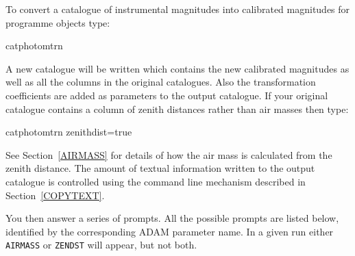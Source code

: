 \documentclass[twoside,11pt]{starlink}
\begin{document}
To convert a catalogue of instrumental magnitudes into calibrated
magnitudes for programme objects type:

\begin{terminalv}
catphotomtrn
\end{terminalv}

A new catalogue will be written which contains the new calibrated
magnitudes as well as all the columns in the original catalogues.  Also
the transformation coefficients are added as parameters to the output
catalogue.  If your original catalogue contains a column of zenith
distances rather than air masses then type:

\begin{terminalv}
catphotomtrn  zenithdist=true
\end{terminalv}

See Section~\ref{AIRMASS} for details of how the air mass is calculated
from the zenith distance.  The amount of textual information written to
the output catalogue is controlled using the command line mechanism
described in Section~\ref{COPYTEXT}.

You then answer a series of prompts.  All the possible prompts are
listed below, identified by the corresponding ADAM parameter name.  In
a given run either \texttt{AIRMASS} or \texttt{ZENDST} will appear, but not
both.
\end{document}
